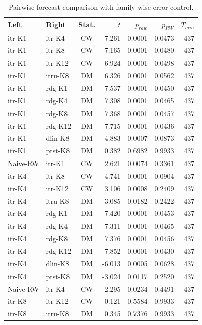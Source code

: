 \begin{table}[!t]
\centering
\caption{Pairwise forecast comparison with family-wise error control.}
\label{tab:dm}
\begin{tabular}{llcrrrr}
\toprule
Left & Right & Stat. & $t$ & $p_{raw}$ & $p_{RW}$ & $T_{min}$ \\
\midrule
itr-K1 & itr-K4 & CW & 7.261 & 0.0001 & 0.0473 & 437 \\
itr-K1 & itr-K8 & CW & 7.165 & 0.0001 & 0.0480 & 437 \\
itr-K1 & itr-K12 & CW & 6.924 & 0.0001 & 0.0498 & 437 \\
itr-K1 & itru-K8 & DM & 6.326 & 0.0001 & 0.0562 & 437 \\
itr-K1 & rdg-K1 & DM & 7.537 & 0.0001 & 0.0450 & 437 \\
itr-K1 & rdg-K4 & DM & 7.308 & 0.0001 & 0.0465 & 437 \\
itr-K1 & rdg-K8 & DM & 7.368 & 0.0001 & 0.0457 & 437 \\
itr-K1 & rdg-K12 & DM & 7.715 & 0.0001 & 0.0436 & 437 \\
itr-K1 & dlin-K8 & DM & -4.883 & 0.0007 & 0.0873 & 437 \\
itr-K1 & ptst-K8 & DM & 0.382 & 0.6982 & 0.9933 & 437 \\
Naive-RW & itr-K1 & CW & 2.621 & 0.0074 & 0.3361 & 437 \\
itr-K4 & itr-K8 & CW & 4.741 & 0.0001 & 0.0904 & 437 \\
itr-K4 & itr-K12 & CW & 3.106 & 0.0008 & 0.2409 & 437 \\
itr-K4 & itru-K8 & DM & 3.085 & 0.0182 & 0.2422 & 437 \\
itr-K4 & rdg-K1 & DM & 7.420 & 0.0001 & 0.0453 & 437 \\
itr-K4 & rdg-K4 & DM & 7.311 & 0.0001 & 0.0465 & 437 \\
itr-K4 & rdg-K8 & DM & 7.376 & 0.0001 & 0.0456 & 437 \\
itr-K4 & rdg-K12 & DM & 7.852 & 0.0001 & 0.0430 & 437 \\
itr-K4 & dlin-K8 & DM & -6.013 & 0.0005 & 0.0628 & 437 \\
itr-K4 & ptst-K8 & DM & -3.024 & 0.0117 & 0.2520 & 437 \\
Naive-RW & itr-K4 & CW & 2.295 & 0.0234 & 0.4491 & 437 \\
itr-K8 & itr-K12 & CW & -0.121 & 0.5584 & 0.9933 & 437 \\
itr-K8 & itru-K8 & DM & 0.345 & 0.7376 & 0.9933 & 437 \\

\end{tabular}
\end{table}
